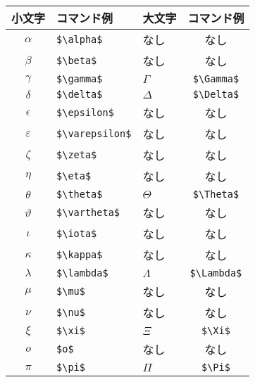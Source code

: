 \documentclass[luatex,fontsize=8pt,paper=b5,twoside,report]{jlreq}%
\begin{document}
\vspace*{.5cm}
  \begingroup
  \begin{center}
    \renewcommand{\arraystretch}{0.9}
  \begin{tabular}{cllc}
  \hline
  小文字         & コマンド例           & 大文字                      & コマンド例 \\
  \hline
  $\alpha$     & \verb|$\alpha$|      & なし                          & なし \\
  $\beta$      & \verb|$\beta$|       & なし                          & なし \\
  $\gamma$     & \verb|$\gamma$|      & $\Gamma$                      & \verb|$\Gamma$| \\
  $\delta$     & \verb|$\delta$|      & $\Delta$                      & \verb|$\Delta$| \\
  $\epsilon$   & \verb|$\epsilon$|    & なし                          & なし \\
  $\varepsilon$& \verb|$\varepsilon$| & なし                          & なし \\
  $\zeta$      & \verb|$\zeta$|       & なし                          & なし \\
  $\eta$       & \verb|$\eta$|        & なし                          & なし \\
  $\theta$     & \verb|$\theta$|      & $\Theta$                      & \verb|$\Theta$| \\
  $\vartheta$  & \verb|$\vartheta$|   & なし                          & なし \\
  $\iota$      & \verb|$\iota$|       & なし                          & なし \\
  $\kappa$     & \verb|$\kappa$|      & なし                          & なし \\
  $\lambda$    & \verb|$\lambda$|     & $\Lambda$                     & \verb|$\Lambda$| \\
  $\mu$        & \verb|$\mu$|         & なし                          & なし \\
  $\nu$        & \verb|$\nu$|         & なし                          & なし \\
  $\xi$        & \verb|$\xi$|         & $\Xi$                         & \verb|$\Xi$| \\
  $o$          & \verb|$o$|           & なし                          & なし \\
  $\pi$        & \verb|$\pi$|         & $\Pi$                         & \verb|$\Pi$| \\

\end{tabular}
\end{center}
\end{document}
